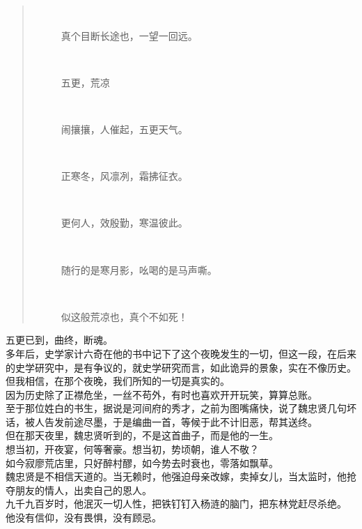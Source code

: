 \begin{multicols}{\theparacolNo}
\begin{quote}
\begin{spacing}{0.5}
{{\begin{description}
					\item[\textcolor{Gray}{\FA }] 真个目断长途也，一望一回远。
					\item[\textcolor{Gray}{\FA }] 五更，荒凉
					\item[\textcolor{Gray}{\FA }] 闹攘攘，人催起，五更天气。
					\item[\textcolor{Gray}{\FA }] 正寒冬，风凛冽，霜拂征衣。
					\item[\textcolor{Gray}{\FA }] 更何人，效殷勤，寒温彼此。
					\item[\textcolor{Gray}{\FA }] 随行的是寒月影，吆喝的是马声嘶。
					\item[\textcolor{Gray}{\FA }] 似这般荒凉也，真个不如死！
				\end{description}
		}}
	\end{spacing}
\end{quote}

五更已到，曲终，断魂。\\

多年后，史学家计六奇在他的书中记下了这个夜晚发生的一切，但这一段，在后来的史学研究中，是有争议的，就史学研究而言，如此诡异的景象，实在不像历史。\\

但我相信，在那个夜晚，我们所知的一切是真实的。\\

因为历史除了正襟危坐，一丝不苟外，有时也喜欢开开玩笑，算算总账。\\

至于那位姓白的书生，据说是河间府的秀才，之前为图嘴痛快，说了魏忠贤几句坏话，被人告发前途尽墨，于是编曲一首，等候于此不计旧恶，帮其送终。\\

但在那天夜里，魏忠贤听到的，不是这首曲子，而是他的一生。\\

想当初，开夜宴，何等奢豪。想当初，势顷朝，谁人不敬？\\

如今寂廖荒店里，只好醉村醪，如今势去时衰也，零落如飘草。\\

魏忠贤是不相信天道的。当无赖时，他强迫母亲改嫁，卖掉女儿，当太监时，他抢夺朋友的情人，出卖自己的恩人。\\

九千九百岁时，他泯灭一切人性，把铁钉钉入杨涟的脑门，把东林党赶尽杀绝。\\

他没有信仰，没有畏惧，没有顾忌。\\


\end{multicols}
